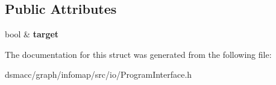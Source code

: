 \subsection*{Public Attributes}
\begin{DoxyCompactItemize}
\item 
\mbox{\label{structArgumentOption_3_01bool_01_4_a3bcd4878b37f6ef1b5f8df4807757d3f}} 
bool \& {\bfseries target}
\end{DoxyCompactItemize}


The documentation for this struct was generated from the following file\+:\begin{DoxyCompactItemize}
\item 
dsmacc/graph/infomap/src/io/Program\+Interface.\+h\end{DoxyCompactItemize}
